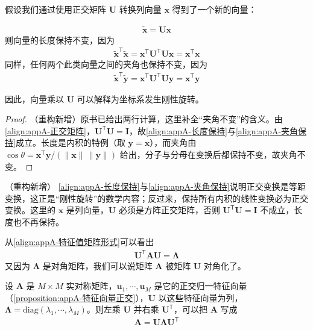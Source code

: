 \documentclass[../main.tex]{subfiles}
\begin{document}
假设我们通过使用正交矩阵 $\bm{U}$ 转换列向量 $\bm{x}$ 得到了一个新的向量：
\begin{proposition}[正交变换保持长度与夹角]\label{proposition:appA-正交变换保内积}
\begin{align}
  \tilde{\bm{x}}=\bm{U}\bm{x}
  \label{align:appA-正交变换}
\end{align}
则向量的长度保持不变，因为
\begin{align}
  \tilde{\bm{x}}^{\mathsf{T}}\tilde{\bm{x}}=\bm{x}^{\mathsf{T}}\bm{U}^{\mathsf{T}}\bm{U}\bm{x}=\bm{x}^{\mathsf{T}}\bm{x}
  \label{align:appA-长度保持}
\end{align}
同样，任何两个此类向量之间的夹角也保持不变，因为
\begin{align}
  \tilde{\bm{x}}^{\mathsf{T}}\tilde{\bm{y}}=\bm{x}^{\mathsf{T}}\bm{U}^{\mathsf{T}}\bm{U}\bm{y}=\bm{x}^{\mathsf{T}}\bm{y}
  \label{align:appA-夹角保持}
\end{align}
\end{proposition}

因此，向量乘以 $\bm{U}$ 可以解释为坐标系发生刚性旋转。

\begin{proof}
（重构新增）原书已给出两行计算，这里补全“夹角不变”的含义。由\eqref{align:appA-正交矩阵}，$\bm{U}^{\mathsf{T}}\bm{U}=\bm{I}$，故\eqref{align:appA-长度保持}与\eqref{align:appA-夹角保持}成立。长度是内积的特例（取 $\bm{y}=\bm{x}$），而夹角由 $\cos\theta=\bm{x}^{\mathsf{T}}\bm{y}/(\|\bm{x}\|\,\|\bm{y}\|)$ 给出，分子与分母在变换后都保持不变，故夹角不变。
\end{proof}

\begin{remark}（重构新增）
\eqref{align:appA-长度保持}与\eqref{align:appA-夹角保持}说明正交变换是等距变换，这正是“刚性旋转”的数学内容；反过来，保持所有内积的线性变换必为正交变换。这里的 $\bm{x}$ 是列向量，$\bm{U}$ 必须是方阵正交矩阵，否则 $\bm{U}^{\mathsf{T}}\bm{U}=\bm{I}$ 不成立，长度也不再保持。
\end{remark}

从\eqref{align:appA-特征值矩阵形式}可以看出
\begin{align}
  \bm{U}^{\mathsf{T}}\bm{A}\bm{U}=\bm{\Lambda}
  \label{align:appA-对角化}
\end{align}
又因为 $\bm{\Lambda}$ 是对角矩阵，我们可以说矩阵 $\bm{A}$ 被矩阵 $\bm{U}$ 对角化了。

\begin{theorem}[实对称矩阵的谱分解]\label{theorem:appA-谱分解}
设 $\bm{A}$ 是 $M\times M$ 实对称矩阵，$\bm{u}_1,\cdots,\bm{u}_M$ 是它的正交归一特征向量（\cref{proposition:appA-特征向量正交}），$\bm{U}$ 以这些特征向量为列，$\bm{\Lambda}=\mathrm{diag}(\lambda_1,\cdots,\lambda_M)$。则左乘 $\bm{U}$ 并右乘 $\bm{U}^{\mathsf{T}}$，可以把 $\bm{A}$ 写成
\begin{align}
  \bm{A}=\bm{U}\bm{\Lambda}\bm{U}^{\mathsf{T}}
  \label{align:appA-谱分解}
\end{align}
\end{theorem}
\end{document}

